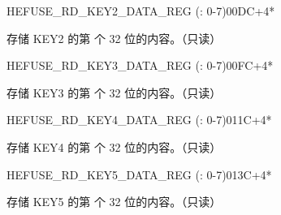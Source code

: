 \begin{register}{H}{EFUSE\_RD\_KEY2\_DATA\_REG (: 0-7)}{\hexprefix{}00DC+4*}\label{regdesc:EFUSERDKEY2DATANREG}
%
\regnewline%
\begin{regdesc}\begin{reglist}
\label{fielddesc:EFUSEKEY2DATAN}\item [EFUSE\_KEY2\_DATA\regindex{n}] 存储 KEY2 的第  个 32 位的内容。（只读）
\end{reglist}\end{regdesc}
\end{register}


\begin{register}{H}{EFUSE\_RD\_KEY3\_DATA\_REG (: 0-7)}{\hexprefix{}00FC+4*}\label{regdesc:EFUSERDKEY3DATANREG}
%
\regnewline%
\begin{regdesc}\begin{reglist}
\label{fielddesc:EFUSEKEY3DATAN}\item [EFUSE\_KEY3\_DATA\regindex{n}] 存储 KEY3 的第  个 32 位的内容。（只读）
\end{reglist}\end{regdesc}
\end{register}


\begin{register}{H}{EFUSE\_RD\_KEY4\_DATA\_REG (: 0-7)}{\hexprefix{}011C+4*}\label{regdesc:EFUSERDKEY4DATANREG}
%
\regnewline%
\begin{regdesc}\begin{reglist}
\label{fielddesc:EFUSEKEY4DATAN}\item [EFUSE\_KEY4\_DATA\regindex{n}] 存储 KEY4 的第  个 32 位的内容。（只读）
\end{reglist}\end{regdesc}
\end{register}


\begin{register}{H}{EFUSE\_RD\_KEY5\_DATA\_REG (: 0-7)}{\hexprefix{}013C+4*}\label{regdesc:EFUSERDKEY5DATANREG}
%
\regnewline%
\begin{regdesc}\begin{reglist}
\label{fielddesc:EFUSEKEY5DATAN}\item [EFUSE\_KEY5\_DATA\regindex{n}] 存储 KEY5 的第  个 32 位的内容。（只读）
\end{reglist}\end{regdesc}
\end{register}


